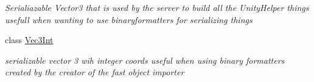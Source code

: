 \begin{DoxyCompactItemize}
\begin{DoxyCompactList}\small\item\em Serialiazable Vector3 that is used by the server to build all the Unity\+Helper things usefull when wanting to use binaryformatters for serializing things \end{DoxyCompactList}\item 
class \mbox{\hyperlink{class_virt_muse_web_1_1_utility_1_1_vec3_int}{Vec3\+Int}}
\begin{DoxyCompactList}\small\item\em serializable vector 3 wih integer coords useful when using binary formatters created by the creator of the fast object importer \end{DoxyCompactList}\end{DoxyCompactItemize}
